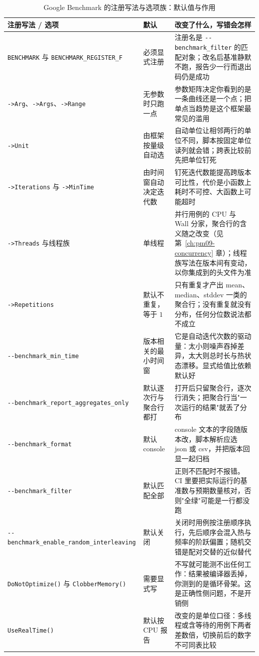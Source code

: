 \documentclass[12pt,a4paper,fontset=fandol]{ctexbook}
\newcommand{\Fn}[1]{\texttt{#1()}}
\newcommand{\Tp}[1]{\texttt{#1}}
\newcommand{\Opt}[1]{\texttt{-\/-#1}}
\newcommand{\Bk}{\discretionary{}{}{}}
\newcommand{\Lang}[1]{\textsf{#1}}
\newcommand{\MWall}{\Lang{Wall}}
\newcommand{\MCpu}{\Lang{CPU}}
\begin{document}
\begin{table}[htbp]
\centering
\small
\begin{tabularx}{\textwidth}{>{\raggedright\arraybackslash}p{} >{\raggedright\arraybackslash}p{} >{\raggedright\arraybackslash}X}
\toprule
注册写法 / 选项 & 默认 & 改变了什么，写错会怎样 \\
\midrule
\Tp{BENCHMARK} 与 \Tp{BENCHMARK\_{\Bk}REGISTER\_{\Bk}F} & 必须显式注册 & 注册名是 \Opt{benchmark\_{\Bk}filter} 的匹配对象；改名后基准静默不跑，报告少一行而退出码仍是成功 \\
\Tp{->Arg}、\Tp{->Args}、\Tp{->Range} & 无参数时只跑一点 & 参数矩阵决定你看到的是一条曲线还是一个点；把单点当趋势是这个框架最常见的滥用 \\
\Tp{->Unit} & 由框架按量级自动选 & 自动单位让相邻两行的单位不同，脚本按固定单位读列就会错；跨表比较前先把单位钉死 \\
\Tp{-{\Bk}>Iterations} 与 \Tp{->MinTime} & 由时间窗自动决定迭代数 & 钉死迭代数能提高跨版本可比性，代价是小函数上耗时不可控、大函数上可能超时 \\
\Tp{->Threads} 与线程族 & 单线程 & 并行用例的 \MCpu{} 与 \MWall{} 分家，聚合行的含义随之改变（见第~\ref{ch:pm09-concurrency} 章）；线程族写法在版本间有变动，以你集成到的头文件为准 \\
\Tp{-{\Bk}>Repetitions} & 默认不重复，等于 $1$ & 只有重复才产出 mean、median、stddev 一类的聚合行；没有重复就没有分布，任何分位数说法都不成立 \\
\Opt{benchmark\_{\Bk}min\_{\Bk}time} & 版本相关的最小时间窗 & 它是自动迭代次数的驱动量：太小则噪声吞掉差异，太大则总时长与热状态漂移。显式给值比依赖默认好 \\
\Opt{benchmark\_{\Bk}report\_{\Bk}aggregates\_{\Bk}only} & 默认逐次行与聚合行都打 & 打开后只留聚合行，逐次行消失；把聚合行当"一次运行的结果"就丢了分布 \\
\Opt{benchmark\_{\Bk}format} & 默认 console & console 文本的字段随版本改，脚本解析应选 json 或 csv，并把版本回显一起归档 \\
\Opt{benchmark\_{\Bk}filter} & 默认匹配全部 & 正则不匹配时不报错。CI 里要把实际运行的基准数与预期数量核对，否则"全绿"可能是一行都没跑 \\
\Opt{benchmark\_{\Bk}enable\_{\Bk}random\_{\Bk}interleaving} & 默认关闭 & 关闭时用例按注册顺序执行，先后顺序会混入热与频率的阶跃偏置；随机交错是配对交替的近似替代 \\
\Fn{DoNotOptimize} 与 \Fn{ClobberMemory} & 需要显式写 & 不写就可能测不出任何工作：结果被编译器丢掉，你测到的是循环骨架。这是正确性侧问题，不是开销侧 \\
\Fn{UseRealTime} & 默认按 \MCpu{} 报告 & 改变的是单位口径：多线程或含等待的用例下两者差数倍，切换前后的数字不可同表比较 \\
\end{tabularx}
\caption{Google Benchmark 的注册写法与选项族：默认值与作用}
\label{tab:pmapB-gbench}
\end{table}
\end{document}
